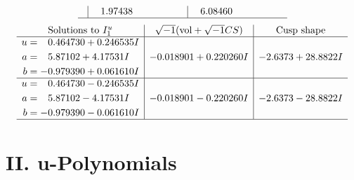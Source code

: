 \documentclass[1p]{elsarticle_modified}
\theoremstyle{definition}
\newcommand{\I}{\sqrt{-1}}
\begin{document}
$$\begin{array}{c|c|c}
 & \phantom{-}1.97438\phantom{ +0.000000I} & \phantom{-}6.08460\phantom{ +0.000000I}\\
 \hline 
 \end{array}$$\newpage$$\begin{array}{c|c|c}  
\text{Solutions to }I^u_{1}& \I (\text{vol} + \sqrt{-1}CS) & \text{Cusp shape}\\
 \hline 
\begin{aligned}
u &= \phantom{-}0.464730 + 0.246535 I \\
a &= \phantom{-}5.87102 + 4.17531 I \\
b &= -0.979390 + 0.061610 I\end{aligned}
 & -0.018901 + 0.220260 I & -2.6373 + 28.8822 I \\ \hline\begin{aligned}
u &= \phantom{-}0.464730 - 0.246535 I \\
a &= \phantom{-}5.87102 - 4.17531 I \\
b &= -0.979390 - 0.061610 I\end{aligned}
 & -0.018901 - 0.220260 I & -2.6373 - 28.8822 I\\
 \hline 
 \end{array}$$\newpage
\newpage\renewcommand{\arraystretch}{1}
\centering \section*{ II. u-Polynomials}
\end{document}
